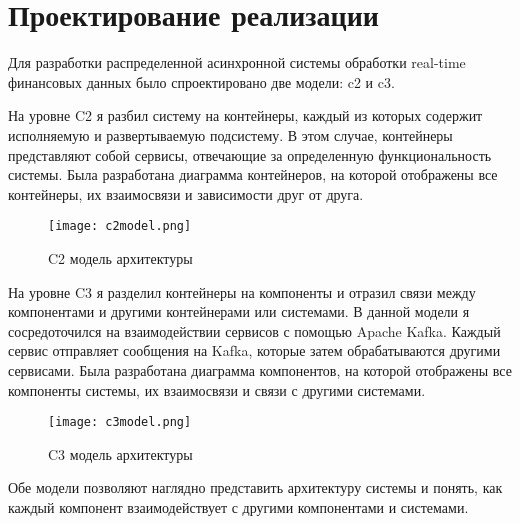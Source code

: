 \section{Проектирование реализации}
Для разработки распределенной асинхронной системы обработки real-time финансовых данных было спроектировано две модели: c2 и c3.

На уровне C2 я разбил систему на контейнеры, каждый из которых содержит исполняемую и развертываемую подсистему. В этом случае, контейнеры представляют собой сервисы, отвечающие за определенную функциональность системы. Была разработана диаграмма контейнеров, на которой отображены все контейнеры, их взаимосвязи и зависимости друг от друга.

\begin{figure}[h]
    \centering
    \texttt{[image: c2model.png]}
    \caption{C2 модель архитектуры}
\end{figure}


На уровне C3 я разделил контейнеры на компоненты и отразил связи между компонентами и другими контейнерами или системами. В данной модели я сосредоточился на взаимодействии сервисов с помощью Apache Kafka. Каждый сервис отправляет сообщения на Kafka, которые затем обрабатываются другими сервисами. Была разработана диаграмма компонентов, на которой отображены все компоненты системы, их взаимосвязи и связи с другими системами.


\begin{figure}[h]
    \centering
    \texttt{[image: c3model.png]}
    \caption{C3 модель архитектуры}
\end{figure}

Обе модели позволяют наглядно представить архитектуру системы и понять, как каждый компонент взаимодействует с другими компонентами и системами.